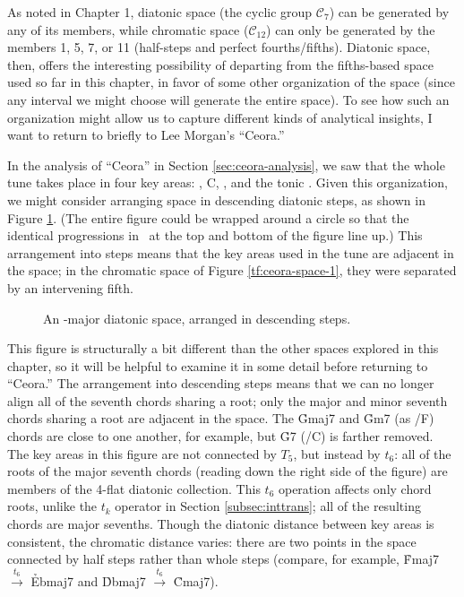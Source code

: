 As noted in Chapter 1, diatonic space (the cyclic group $\mathcal{C}_7$) can
be generated by any of its members, while chromatic space ($\mathcal{C}_{12}$)
can only be generated by the members 1, 5, 7, or 11 (half-steps and perfect
fourths/fifths). Diatonic \tf space, then, offers the interesting possibility
of departing from the fifths-based space used so far in this chapter, in
favor of some other organization of the space (since any interval we might
choose will generate the entire space). To see how such an organization
might allow us to capture different kinds of analytical insights, I want to
return to briefly to Lee Morgan's ``Ceora.''

In the analysis of ``Ceora'' in Section \ref{sec:ceora-analysis}, we saw that
the whole tune takes place in four key areas: \Dflat, C, \Bflat, and the tonic
\Aflat. Given this organization, we might consider arranging \tf space in
descending diatonic steps, as shown in Figure \ref{tfe:ab-diatonic-space}.
(The entire figure could be wrapped around a circle so that the identical \tfo
progressions in \Aflat\ at the top and bottom of the figure line up.) This
arrangement into steps means that the key areas used in the tune are adjacent
in the space; in the chromatic space of Figure \ref{tf:ceora-space-1}, they
were separated by an intervening fifth.

\begin{figure}[tbp]
  \caption{An \Aflat{}-major diatonic \tf space, arranged in descending steps.}
  \label{tfe:ab-diatonic-space}
\end{figure}

This figure is structurally a bit different than the other spaces explored in
this chapter, so it will be helpful to examine it in some detail before
returning to ``Ceora.'' The arrangement into descending steps means that we
can no longer align all of the seventh chords sharing a root; only the major
and minor seventh chords sharing a root are adjacent in the space.
The \h{Gmaj7} and \h{Gm7} (as \ii/F) chords are close to one another, for
example, but \h{G7} (\V/C) is farther removed. The key areas in this figure
are not connected by $T_5$, but instead by $t_6$: all of the roots of the
major seventh chords (reading down the right side of the figure) are members
of the 4-flat diatonic collection. This $t_6$ operation affects
only chord roots, unlike the $t_k$ operator in Section \ref{subsec:inttrans};
all of the resulting chords are major sevenths. Though the diatonic distance
between key areas is consistent, the chromatic distance varies: there are two
points in the space connected by half steps rather than whole steps (compare,
for example, \h{Fmaj7} $\xrightarrow{\;t_6\;}$ \h{Ebmaj7} and \h{Dbmaj7}
$\xrightarrow{\;t_6\;}$ \h{Cmaj7}).

